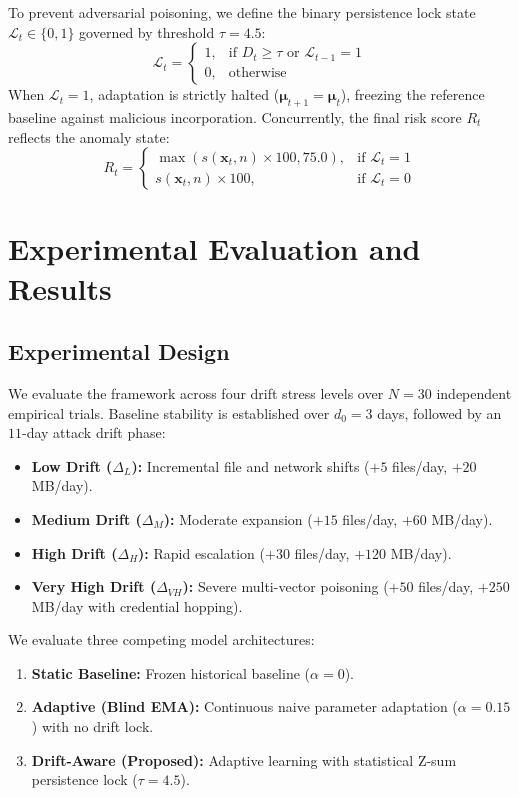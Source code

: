 \documentclass[conference]{IEEEtran}
\begin{document}
To prevent adversarial poisoning, we define the binary persistence lock state $\mathcal{L}_t \in \{0, 1\}$ governed by threshold $\tau = 4.5$:
\begin{equation}
\mathcal{L}_t = \begin{cases}
1, & \text{if } D_t \ge \tau \text{ or } \mathcal{L}_{t-1} = 1 \\
0, & \text{otherwise}
\end{cases}
\end{equation}
When $\mathcal{L}_t = 1$, adaptation is strictly halted ($\boldsymbol{\mu}_{t+1} = \boldsymbol{\mu}_t$), freezing the reference baseline against malicious incorporation. Concurrently, the final risk score $R_t$ reflects the anomaly state:
\begin{equation}
R_t = \begin{cases}
\max(s(\mathbf{x}_t, n) \times 100, 75.0), & \text{if } \mathcal{L}_t = 1 \\
s(\mathbf{x}_t, n) \times 100, & \text{if } \mathcal{L}_t = 0
\end{cases}
\end{equation}

\section{Experimental Evaluation and Results}

\subsection{Experimental Design}
We evaluate the framework across four drift stress levels over $N = 30$ independent empirical trials. Baseline stability is established over $d_0 = 3$ days, followed by an $11$-day attack drift phase:
\begin{itemize}
    \item \textbf{Low Drift ($\Delta_L$):} Incremental file and network shifts ($+5$ files/day, $+20$ MB/day).
    \item \textbf{Medium Drift ($\Delta_M$):} Moderate expansion ($+15$ files/day, $+60$ MB/day).
    \item \textbf{High Drift ($\Delta_H$):} Rapid escalation ($+30$ files/day, $+120$ MB/day).
    \item \textbf{Very High Drift ($\Delta_{VH}$):} Severe multi-vector poisoning ($+50$ files/day, $+250$ MB/day with credential hopping).
\end{itemize}

We evaluate three competing model architectures:
\begin{enumerate}
    \item \textbf{Static Baseline:} Frozen historical baseline ($\alpha = 0$).
    \item \textbf{Adaptive (Blind EMA):} Continuous naive parameter adaptation ($\alpha = 0.15$) with no drift lock.
    \item \textbf{Drift-Aware (Proposed):} Adaptive learning with statistical Z-sum persistence lock ($\tau = 4.5$).
\end{enumerate}
\end{document}
